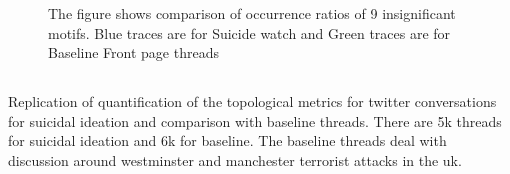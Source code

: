 \begin{figure}[!h]
    
    \label{fig:MotifOccurance}
    \vspace{-0.4cm}
    \caption{ The figure shows comparison of occurrence ratios of 9 insignificant motifs. Blue traces are for Suicide watch and Green traces are for Baseline Front page threads}
    \vspace{-0.4cm}
\end{figure}





\subsection{}
Replication of quantification of the topological metrics for twitter conversations for suicidal ideation and comparison with baseline threads. There are 5k threads for suicidal ideation and 6k for baseline. The baseline threads deal with discussion around westminster and manchester terrorist attacks in the uk.

